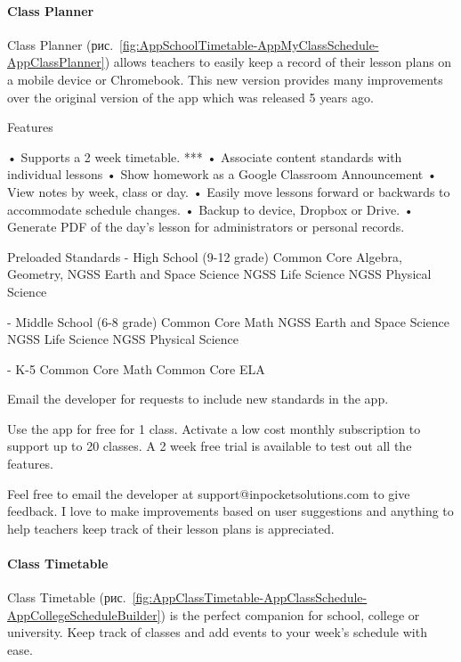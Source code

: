 \paragraph{Class Planner}

Class Planner (рис.~\ref{fig:AppSchoolTimetable-AppMyClassSchedule-AppClassPlanner}) allows teachers to easily keep a record of their lesson plans on a mobile device or Chromebook. This new version provides many improvements over the original version of the app which was released 5 years ago.

Features

• Supports a 2 week timetable. ***
• Associate content standards with individual lessons
• Show homework as a Google Classroom Announcement
• View notes by week, class or day.
• Easily move lessons forward or backwards to accommodate schedule changes.
• Backup to device, Dropbox or Drive.
• Generate PDF of the day's lesson for administrators or personal records.

Preloaded Standards
- High School (9-12 grade)
Common Core Algebra, Geometry, 
NGSS Earth and Space Science
NGSS Life Science
NGSS Physical Science

- Middle School (6-8 grade)
Common Core Math
NGSS Earth and Space Science
NGSS Life Science
NGSS Physical Science

- K-5
Common Core Math
Common Core ELA

Email the developer for requests to include new standards in the app.

Use the app for free for 1 class. Activate a low cost monthly subscription to support up to 20 classes. A 2 week free trial is available to test out all the features.

Feel free to email the developer at support@inpocketsolutions.com to give feedback. I love to make improvements based on user suggestions and anything to help teachers keep track of their lesson plans is appreciated.

\paragraph{Class Timetable}


Class Timetable (рис.~\ref{fig:AppClassTimetable-AppClassSchedule-AppCollegeScheduleBuilder}) is the perfect companion for school, college or university. Keep track of classes and add events to your week's schedule with ease. 

